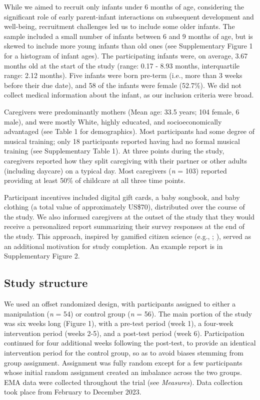 \documentclass[
]{article}
\begin{document}
While we aimed to recruit only infants under 6 months of age,
considering the significant role of early parent-infant interactions on
subsequent development and well-being, recruitment challenges led us to
include some older infants. The sample included a small number of
infants between 6 and 9 months of age, but is skewed to include more
young infants than old ones (see Supplementary Figure 1 for a histogram
of infant ages). The participating infants were, on average, 3.67 months
old at the start of the study (range: 0.17 - 8.93 months, interquartile
range: 2.12 months). Five infants were born pre-term (i.e., more than 3
weeks before their due date), and 58 of the infants were female
(52.7\%). We did not collect medical information about the infant, as
our inclusion criteria were broad.

Caregivers were predominantly mothers (Mean age: 33.5 years; 104 female,
6 male), and were mostly White, highly educated, and socioeconomically
advantaged (see Table 1 for demographics). Most participants had some
degree of musical training; only 18 participants reported having had no
formal musical training (see Supplementary Table 1). At three points
during the study, caregivers reported how they split caregiving with
their partner or other adults (including daycare) on a typical day. Most
caregivers (\emph{n} = 103) reported providing at least 50\% of
childcare at all three time points.

Participant incentives included digital gift cards, a baby songbook, and
baby clothing (a total value of approximately US\$70), distributed over
the course of the study. We also informed caregivers at the outset of
the study that they would receive a personalized report summarizing
their survey responses at the end of the study. This approach, inspired
by gamified citizen science (e.g., ; ), served as an
additional motivation for study completion. An example report is in
Supplementary Figure 2.

\subsection{Study structure}\label{study-structure}

We used an offset randomized design, with participants assigned to
either a manipulation (\emph{n} = 54) or control group (\emph{n} = 56).
The main portion of the study was six weeks long (Figure 1), with a
pre-test period (week 1), a four-week intervention period (weeks 2-5),
and a post-test period (week 6). Participation continued for four
additional weeks following the post-test, to provide an identical
intervention period for the control group, so as to avoid biases
stemming from group assignment. Assignment was fully random except for a
few participants whose initial random assignment created an imbalance
across the two groups. EMA data were collected throughout the trial (see
\emph{Measures}). Data collection took place from February to December
2023.
\end{document}
